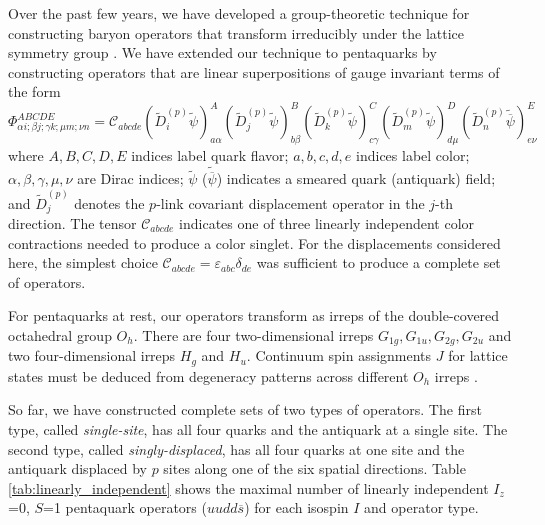 \documentclass[letterpaper]{jpconf}
\begin{document}
Over the past few years, we have developed a group-theoretic technique for
constructing baryon operators that transform irreducibly under the lattice
symmetry group \cite{Edwards:2003mv,Basak:2003yd,Basak:2004hp,Basak:2004ib}.
We have extended our technique to pentaquarks by constructing operators
that are linear superpositions of gauge invariant terms of the form
%
\begin{equation}
\label{eq:elemental_operator}
\Phi_{\alpha i; \beta j; \gamma k; \mu m; \nu n}^{ABCDE} =
\mathcal{C}_{abcde}
\left( \widetilde{D}_i^{(p)} \widetilde{\psi} \right)_{a \alpha}^A
\left( \widetilde{D}_j^{(p)} \widetilde{\psi} \right)_{b \beta}^B
\left( \widetilde{D}_k^{(p)} \widetilde{\psi} \right)_{c \gamma}^C
\left( \widetilde{D}_m^{(p)} \widetilde{\psi} \right)_{d \mu}^D
\left( \widetilde{D}_n^{(p)} \widetilde{\overline{\psi}} \right)_{e \nu}^E
\end{equation}
%
where $A, B, C, D, E$ indices label quark flavor; $a, b, c, d, e$ indices
label color; $\alpha, \beta, \gamma, \mu, \nu$ are Dirac indices;
$\widetilde{\psi}$ ($\widetilde{\overline{\psi}}$) indicates a smeared quark
(antiquark) field; and $\widetilde{D}_j^{(p)}$ denotes the $p$-link covariant
displacement operator in the $j$-th direction.  The tensor
$\mathcal{C}_{abcde}$ indicates one of three linearly independent color
contractions needed to produce a color singlet.  For the displacements
considered here, the simplest choice $\mathcal{C}_{abcde} = \varepsilon_{abc}
\delta_{de}$ was sufficient to produce a complete set of operators.

For pentaquarks at rest, our operators transform as irreps of the
double-covered octahedral group $O_h$.  There are four two-dimensional
irreps $G_{1g}, G_{1u}, G_{2g}, G_{2u}$ and two four-dimensional irreps
$H_g$ and $H_u$.  Continuum spin assignments $J$ for lattice states
must be deduced from degeneracy patterns across different $O_h$ irreps
\cite{Johnson:1982yq}.

So far, we have constructed complete sets of two types of operators.  The
first type, called \textsl{single-site}, has all four quarks and the antiquark
at a single site.  The second type, called \textsl{singly-displaced}, has all
four quarks at one site and the antiquark displaced by $p$ sites along one of
the six spatial directions.  Table \ref{tab:linearly_independent} shows
the maximal number of linearly independent $I_z$=0, $S$=1 pentaquark
operators ($uudd\overline{s}$) for each isospin $I$ and operator type.
\end{document}
